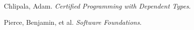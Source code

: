 \documentclass{article}
\begin{document}
\begin{thebibliography}{xx}
    Chlipala, Adam. \emph{Certified Programming with Dependent Types}.

    Pierce, Benjamin, et al. \emph{Software Foundations}.

%
\end{thebibliography}
\end{document}
